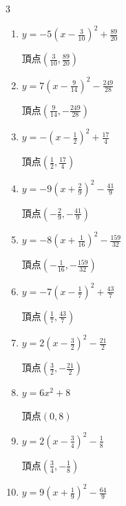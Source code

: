 \begin{multicols}{3}
\begin{enumerate}
        $\displaystyle 頂点\left( -\frac{1}{12} , -\frac{71}{24} \right)$

  \item $\displaystyle y=-5\left( x-\frac{3}{10}\right)^{2}+\frac{89}{20}$

        $\displaystyle 頂点\left( \frac{3}{10} , \frac{89}{20} \right)$

  \item $\displaystyle y=7\left( x-\frac{9}{14}\right)^{2}-\frac{249}{28}$

        $\displaystyle 頂点\left( \frac{9}{14} , -\frac{249}{28} \right)$

  \item $\displaystyle y=-\left( x-\frac{1}{2}\right)^{2}+\frac{17}{4}$

        $\displaystyle 頂点\left( \frac{1}{2} , \frac{17}{4} \right)$

  \item $\displaystyle y=-9\left( x+\frac{2}{9}\right)^{2}-\frac{41}{9}$

        $\displaystyle 頂点\left( -\frac{2}{9} , -\frac{41}{9} \right)$

  \item $\displaystyle y=-8\left( x+\frac{1}{16}\right)^{2}-\frac{159}{32}$

        $\displaystyle 頂点\left( -\frac{1}{16} , -\frac{159}{32} \right)$

  \item $\displaystyle y=-7\left( x-\frac{1}{7}\right)^{2}+\frac{43}{7}$

        $\displaystyle 頂点\left( \frac{1}{7} , \frac{43}{7} \right)$

  \item $\displaystyle y=2\left( x-\frac{3}{2}\right)^{2}-\frac{21}{2}$

        $\displaystyle 頂点\left( \frac{3}{2} , -\frac{21}{2} \right)$

  \item $\displaystyle y=6x^{2}+8$

        $\displaystyle 頂点\left( 0 , 8 \right)$

  \item $\displaystyle y=2\left( x-\frac{3}{4}\right)^{2}-\frac{1}{8}$

        $\displaystyle 頂点\left( \frac{3}{4} , -\frac{1}{8} \right)$

\columnbreak %

\resetques

  \item $\displaystyle y=9\left( x+\frac{1}{9}\right)^{2}-\frac{64}{9}$


\end{enumerate}
\end{multicols}
